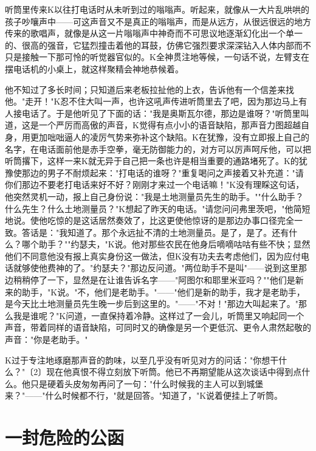 \documentclass[12pt,a4paper]{article}
\begin{document}
听筒里传来K以往打电话时从未听到过的嗡嗡声。听起来，就像从一大片乱哄哄的孩子吵嚷声中——可这声音又不是真正的嗡嗡声，而是从远方，从很远很远的地方传来的歌唱声，就像是从这一片嗡嗡声中神奇而不可思议地逐渐幻化出一个单一的、很高的强音，它猛烈撞击着他的耳鼓，仿佛它强烈要求深深钻入人体内部而不只是接触一下那可怜的听觉器官似的。K全神贯注地等候，一句话不说，左臂支在摆电话机的小桌上，就这样聚精会神地恭候着。

他不知过了多长时间；只知道后来老板拉扯他的上衣，告诉他有一个信差来找他。"走开！"K忍不住大叫一声，也许这吼声传进听筒里去了吧，因为那边马上有人接电话了。于是他听见了下面的话："我是奥斯瓦尔德，那边是谁呀？"听筒里叫道，这是一个严厉而高傲的声音，K觉得有点小小的语音缺陷，那声音力图超越自身，用更加咄咄逼人的凌厉气势来弥补这个缺陷。K在犹豫，没有立即报上自己的名字，在电话面前他是赤手空拳，毫无防御能力的，对方可以厉声呵斥他，可以把听筒撂下，这样一来K就无异于自己把一条也许是相当重要的通路堵死了。K的犹豫使那边的男子不耐烦起来："打电话的谁呀？"重复喝问之声接着又补充道："请你们那边不要老打电话来好不好？刚刚才来过一个电话嘛！"K没有理睬这句话，他突然灵机一动，报上自己身份说："我是土地测量员先生的助手。""什么助手？什么先生？什么土地测量员？"K想起了昨天的电话。"请您问问弗里茨吧，"他简短地说。使他吃惊的是这话居然奏效了，比这更使他惊讶的是那边办事口径完全一致。答话是："我知道了。那个永远扯不清的土地测量员。是了，是了。还有什么？哪个助手？""约瑟夫，"K说。他对那些农民在他身后嘀嘀咕咕有些不快；显然他们不同意他没有报上真实身份这一做法，但K没有功夫去考虑他们，因为应付电话就够使他费神的了。"约瑟夫？"那边反问道。"两位助手不是叫"——说到这里那边稍稍停了一下，显然是在让谁告诉名字——"阿图尔和耶里米亚吗？""他们是新来的助手，"K说。"不，他们是老助手。"——"他们是新的助手，我才是老助手，是今天比土地测量员先生晚一步后到这里的。"——"不对！"那边大叫起来了。"那么我是谁呢？"K问道，一直保持着冷静。这样过了一会儿，听筒里又响起同一个声音，带着同样的语音缺陷，可同时又的确像是另一个更低沉、更令人肃然起敬的声音："你是老助手。"

K过于专注地琢磨那声音的韵味，以至几乎没有听见对方的问话："你想干什么？"〔2〕现在他真恨不得立刻放下听筒。他已不再期望能从这次谈话中得到点什么。他只是硬着头皮匆匆再问了一句："什么时候我的主人可以到城堡来？"——"什么时候都不行，"就是回答。"知道了，"K说着便挂上了听筒。
\par{}
\newpage
\section{一封危险的公函}
\vspace{0.5em}
\vspace{0.3em}
\end{document}
